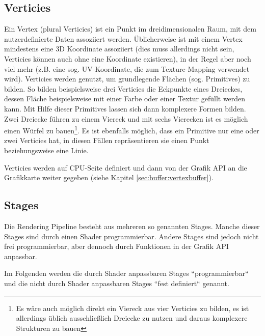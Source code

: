 \subsection{Verticies}
Ein Vertex (plural Verticies) ist ein Punkt im dreidimensionalen Raum, mit dem nutzerdefinierte Daten assoziiert werden. Üblicherweise ist mit einem Vertex mindestens eine 3D Koordinate assoziiert (dies muss allerdings nicht sein, Verticies können auch ohne eine Koordinate existieren), in der Regel aber noch viel mehr (z.B. eine sog. UV-Koordinate, die zum Texture-Mapping verwendet wird). Verticies werden genutzt, um grundlegende Flächen (sog. Primitives) zu bilden. So bilden beispielsweise drei Verticies die Eckpunkte eines Dreieckes, dessen Fläche beispielsweise mit einer Farbe oder einer Textur gefüllt werden kann. Mit Hilfe dieser Primitives lassen sich dann komplexere Formen bilden. Zwei Dreiecke führen zu einem Viereck und mit sechs Vierecken ist es möglich einen Würfel zu bauen\footnote{Es wäre auch möglich direkt ein Viereck aus vier Verticies zu bilden, es ist allerdings üblich ausschließlich Dreiecke zu nutzen und daraus komplexere Strukturen zu bauen}. Es ist ebenfalls möglich, dass ein Primitive nur eine oder zwei Verticies hat, in diesen Fällen repräsentieren sie einen Punkt beziehungsweise eine Linie.

Verticies werden auf CPU-Seite definiert und dann von der Grafik API an die Grafikkarte weiter gegeben (siehe Kapitel \ref{sec:buffer:vertexbuffer}).

\subsection{Stages}
Die Rendering Pipeline besteht aus mehreren so genannten Stages. Manche dieser Stages sind durch einen Shader programmierbar. Andere Stages sind jedoch nicht frei programmierbar, aber dennoch durch Funktionen in der Grafik API anpassbar.

Im Folgenden werden die durch Shader anpassbaren Stages ``programmierbar`` und die nicht durch Shader anpassbaren Stages ``fest definiert`` genannt.


